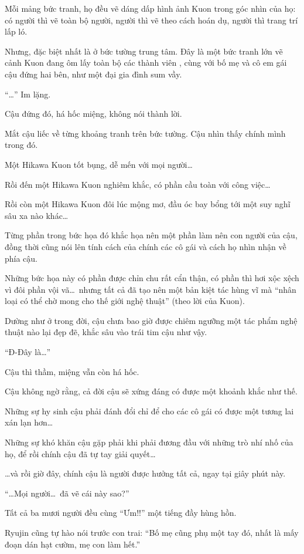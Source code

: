 \documentclass[../main.tex]{subfiles}
\begin{document}
Mỗi mảng bức tranh, họ đều vẽ dáng dấp hình ảnh Kuon trong góc nhìn của họ: có người thì vẽ toàn bộ người, người thì vẽ theo cách hoán dụ, người thì trang trí lấp ló.

Nhưng, đặc biệt nhất là ở bức tường trung tâm. Đây là một bức tranh lớn vẽ cảnh Kuon đang ôm lấy toàn bộ các thành viên \hll, cùng với bố mẹ và cô em gái cậu đứng hai bên, như một đại gia đình sum vầy.

``\dots'' Im lặng.

Cậu đứng đó, há hốc miệng, không nói thành lời.

Mắt cậu liếc về từng khoảng tranh trên bức tường. Cậu nhìn thấy chính mình trong đó.

Một Hikawa Kuon tốt bụng, dễ mến với mọi người\dots

Rồi đến một Hikawa Kuon nghiêm khắc, có phần cầu toàn với công việc\dots

Rồi còn một Hikawa Kuon đôi lúc mộng mơ, đầu óc bay bổng tới một suy nghĩ sâu xa nào khác\dots

Từng phần trong bức họa đó khắc họa nên một phần làm nên con người của cậu, đồng thời cũng nói lên tính cách của chính các cô gái và cách họ nhìn nhận về phía cậu.

Những bức họa này có phần được chỉn chu rất cẩn thận, có phần thì hơi xộc xệch vì đôi phần vội vã\dots\ nhưng tất cả đã tạo nên một bản kiệt tác hùng vĩ mà ``nhân loại có thể chờ mong cho thế giới nghệ thuật'' (theo lời của Kuon).

Dường như ở trong đời, cậu chưa bao giờ được chiêm ngưỡng một tác phẩm nghệ thuật nào lại đẹp đẽ, khắc sâu vào trái tim cậu như vậy.

``Đ-Đây là\dots''

Cậu thì thầm, miệng vẫn còn há hốc.

Cậu không ngờ rằng, cả đời cậu sẽ xứng đáng có được một khoảnh khắc như thế.

Những sự hy sinh cậu phải đánh đổi chỉ để cho các cô gái có được một tương lai xán lạn hơn\dots

Những sự khó khăn cậu gặp phải khi phải đương đầu với những trò nhí nhố của họ, để rồi chính cậu đã tự tay giải quyết\dots

\dots và rồi giờ đây, chính cậu là người được hưởng tất cả, ngay tại giây phút này.

``\dots Mọi người\dots\ đã vẽ cái này sao?''

Tất cả ba mươi người đều cùng ``Ưm!!'' một tiếng đầy hùng hồn.

Ryujin cũng tự hào nói trước con trai: ``Bố mẹ cũng phụ một tay đó, nhất là mấy đoạn dán hạt cườm, mẹ con làm hết.''
\end{document}
